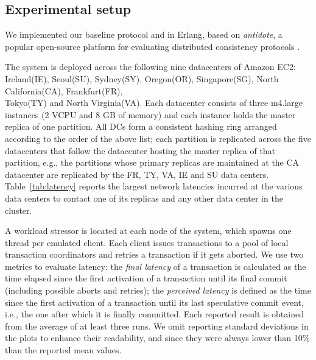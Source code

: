 
\subsection{Experimental setup}
\label{subsec:setup}
We implemented our baseline protocol and \specula in  Erlang, based on \textit{antidote}, a popular open-source platform for evaluating distributed consistency protocols \cite{antidote}.

The system is deployed across the following nine datacenters of Amazon EC2: Ireland(IE), Seoul(SU), Sydney(SY), Oregon(OR), Singapore(SG), North California(CA), Frankfurt(FR), \\ Tokyo(TY) and North Virginia(VA). Each datacenter consists of three m4.large instances (2 VCPU and 8 GB of memory) and each instance holds the master replica of one partition. All DCs form a consistent hashing ring arranged according to the order of the above list; each partition is replicated across the five datacenters that follow the datacenter hosting the master replica of that partition, e.g., 
 the  partitions whose primary replicas are maintained at the CA datacenter are replicated by the 
 FR, TY, VA, IE and SU data centers. Table~\ref{tab:latency} reports the largest network latencies incurred at the various data centers to contact one of its replicas and any other data center in the cluster.
 
 

A workload stressor is located at each node of the system, which spawns one thread per emulated client. Each client issues transactions to a pool of local transaction coordinators and retries a transaction if it gets aborted. We use two metrics to evaluate latency: the \textit{final latency} of a transaction is calculated as the time elapsed since the first activation of a transaction  until its final commit (including possible aborts and retries); the \textit{perceived latency} is defined as the time since the first activation of a transaction until its last speculative commit event, i.e., the one after which it is finally committed. Each reported result is obtained  from the average of at least three runs. We omit reporting standard deviations in the plots to enhance their readability, and since they were always lower than 10\% than the reported mean values.

